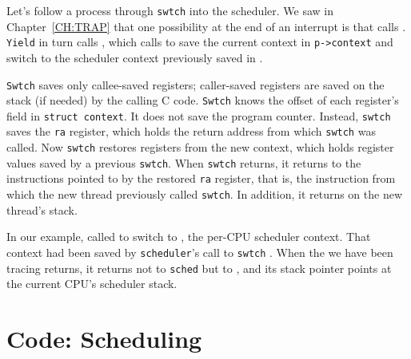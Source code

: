 Let's follow a process through
\lstinline{swtch} 
into the scheduler.
We saw in Chapter~\ref{CH:TRAP}
that one possibility at the end of an interrupt is that 
calls 
.
\lstinline{Yield}
in turn calls
,
which calls
to save the current context in
\lstinline{p->context}
and switch to the scheduler context previously saved in 
.

\lstinline{Swtch}
saves only callee-saved registers;
caller-saved registers are saved on the stack (if needed) by the
calling C code.
\lstinline{Swtch} knows the offset of each
register's field in 
\lstinline{struct context}.
It does not save the program counter.
Instead,
\lstinline{swtch}
saves the
\lstinline{ra} register,
which holds the return address from which
\lstinline{swtch}
was called.
Now
\lstinline{swtch}
restores registers from the new context,
which holds register values saved by a previous
\lstinline{swtch}.
When 
\lstinline{swtch}
returns, it returns to the instructions pointed to
by the restored
\lstinline{ra}
register, that is,
the instruction from which the new thread previously
called \lstinline{swtch}.
In addition, it returns on the new thread's stack.

In our example, 
called
to switch to
,
the per-CPU scheduler context.
That context had been saved by 
\lstinline{scheduler}'s
call to
\lstinline{swtch}
.
When the
we have been tracing returns,
it returns not to
\lstinline{sched}
but to 
,
and its stack pointer points at the current CPU's
scheduler stack.
\section{Code: Scheduling}

